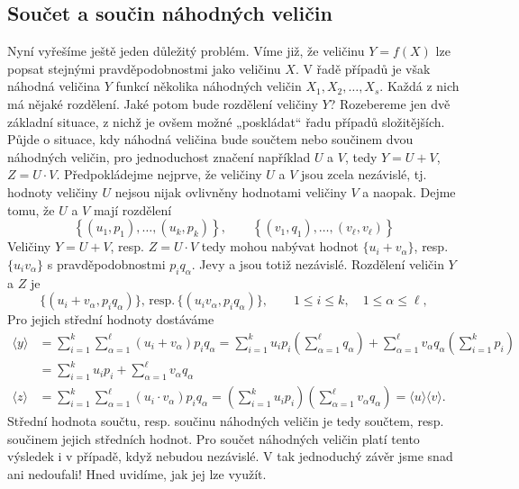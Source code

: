     \subsection{Součet a součin náhodných veličin}
      Nyní vyřešíme ještě jeden důležitý problém. Víme již, že veličinu \(Y = f(X)\) lze popsat 
      stejnými pravděpodobnostmi jako veličinu \(X\). V řadě případů je však náhodná veličina \(Y\) 
      funkcí několika náhodných veličin \(X_1, X_2, \ldots, X_s\). Každá z nich má nějaké 
      rozdělení. Jaké potom bude rozdělení veličiny \(Y\)? Rozebereme jen dvě základní situace, z 
      nichž je ovšem možné „poskládat“ řadu případů složitějších. Půjde o situace, kdy náhodná 
      veličina bude součtem nebo součinem dvou náhodných veličin, pro jednoduchost značení 
      například \(U\) a \(V\), tedy \(Y = U + V\), \(Z = U \cdot V\). Předpokládejme nejprve, že 
      veličiny \(U\) a \(V\) jsou zcela nezávislé, tj. hodnoty veličiny \(U\) nejsou nijak 
      ovlivněny hodnotami veličiny \(V\) a naopak. Dejme tomu, že \(U\) a \(V\) mají rozdělení
      \begin{equation*}
        \left\lbrace (u_1, p_1), \ldots, (u_k, p_k) \right\rbrace, \qquad
        \left\lbrace (v_1, q_1), \ldots, (v_\ell, v_\ell) \right\rbrace
      \end{equation*}
      Veličiny \(Y = U + V\), resp. \(Z = U \cdot V\) tedy mohou nabývat hodnot \(\lbrace u_i + 
      v_\alpha\rbrace\), resp. \(\lbrace u_i v_\alpha\rbrace\) s pravděpodobnostmi \(p_iq_\alpha\). 
      Jevy  a  jsou totiž nezávislé. Rozdělení veličin \(Y\) a \(Z\) je 
      \begin{equation*}
        \lbrace (u_i +v_\alpha, p_iq_\alpha)\rbrace,\, \text{resp.}\,
        \lbrace(u_iv_\alpha, p_iq_\alpha)\rbrace,\qquad 1\leq i\leq k,\quad 1\leq\alpha\leq\ell,
      \end{equation*}
      Pro jejich střední hodnoty dostáváme
      \begin{align*}
        \langle y \rangle 
          &= \sum_{i=1}^{k}\sum_{\alpha=1}^{\ell}(u_i + v_\alpha)p_iq_\alpha
           = \sum_{i=1}^{k}u_ip_i\left(\sum_{\alpha=1}^{\ell}q_\alpha\right) + 
             \sum_{\alpha=1}^{\ell}v_\alpha q_\alpha\left(\sum_{i=1}^{k}p_i\right)  \\
          &= \sum_{i=1}^{k}u_ip_i + \sum_{\alpha=1}^{\ell}v_\alpha q_\alpha         \\
        \langle z \rangle 
          &= \sum_{i=1}^{k}\sum_{\alpha=1}^{\ell}(u_i \cdot v_\alpha)p_iq_\alpha
           = \left(\sum_{i=1}^{k}u_ip_i\right)
             \left(\sum_{\alpha=1}^{\ell}v_\alpha q_\alpha\right) 
           = \langle u \rangle \langle v \rangle.
      \end{align*}
      Střední hodnota součtu, resp. součinu náhodných veličin je tedy součtem, resp. součinem jejich
      středních hodnot. Pro součet náhodných veličin platí tento výsledek i v případě, když nebudou
      nezávislé. V tak jednoduchý závěr jsme snad ani nedoufali! Hned uvidíme, jak jej lze využít.
      
